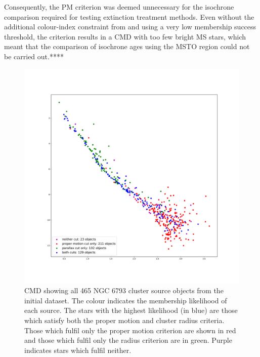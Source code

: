 \documentclass[12pt, a4paper]{report}
\begin{document}
Consequently, the PM criterion was deemed unnecessary for the isochrone comparison required for testing extinction treatment methods. Even without the additional colour-index constraint from \cite{2003ARep...47..263K} and using a very low membership success threshold, the criterion results in a CMD with too few bright MS stars, which meant that the comparison of isochrone ages using the MSTO region could not be carried out.****

\begin{figure}[h!]
\begin{center}
\includegraphics[width=1.0\textwidth]{../NGC6793_pm3sig_vs_plx_cuts_obs_cmd_schilbach.pdf}
\caption{CMD showing all 465 NGC 6793 cluster source objects from the initial dataset. The colour indicates the membership likelihood of each source. The stars with the highest likelihood (in blue) are those which satisfy both the proper motion and cluster radius criteria. Those which fulfil only the proper motion criterion are shown in red and those which fulfil only the radius criterion are in green. Purple indicates stars which fulfil neither.}
\label{NGC_6793_cut_effects}
\end{center}
\end{figure}
\end{document}
